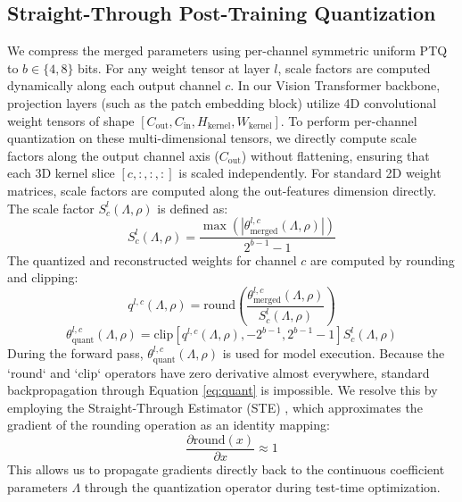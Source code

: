 \subsection{Straight-Through Post-Training Quantization}
We compress the merged parameters using per-channel symmetric uniform PTQ to $b \in \{4, 8\}$ bits. For any weight tensor at layer $l$, scale factors are computed dynamically along each output channel $c$. In our Vision Transformer backbone, projection layers (such as the patch embedding block) utilize 4D convolutional weight tensors of shape $[C_{\text{out}}, C_{\text{in}}, H_{\text{kernel}}, W_{\text{kernel}}]$. To perform per-channel quantization on these multi-dimensional tensors, we directly compute scale factors along the output channel axis ($C_{\text{out}}$) without flattening, ensuring that each 3D kernel slice $[c, :, :, :]$ is scaled independently. For standard 2D weight matrices, scale factors are computed along the out-features dimension directly. The scale factor $S^l_c(\Lambda, \rho)$ is defined as:
\begin{equation}
\label{eq:scale}
S^l_c(\Lambda, \rho) = \frac{\max\left(\left|\theta^{l,c}_{\text{merged}}(\Lambda, \rho)\right|\right)}{2^{b-1} - 1}
\end{equation}
The quantized and reconstructed weights for channel $c$ are computed by rounding and clipping:
\begin{equation}
\label{eq:quant_round}
q^{l,c}(\Lambda, \rho) = \text{round}\left(\frac{\theta^{l,c}_{\text{merged}}(\Lambda, \rho)}{S^l_c(\Lambda, \rho)}\right)
\end{equation}
\begin{equation}
\label{eq:quant}
\theta^{l,c}_{\text{quant}}(\Lambda, \rho) = \text{clip}\left[ q^{l,c}(\Lambda, \rho), -2^{b-1}, 2^{b-1}-1 \right] S^l_c(\Lambda, \rho)
\end{equation}
During the forward pass, $\theta^{l,c}_{\text{quant}}(\Lambda, \rho)$ is used for model execution. Because the `round` and `clip` operators have zero derivative almost everywhere, standard backpropagation through Equation \ref{eq:quant} is impossible. We resolve this by employing the Straight-Through Estimator (STE) \cite{Hubara2017Quantized}, which approximates the gradient of the rounding operation as an identity mapping:
\begin{equation}
\label{eq:ste}
\frac{\partial \text{round}(x)}{\partial x} \approx 1
\end{equation}
This allows us to propagate gradients directly back to the continuous coefficient parameters $\Lambda$ through the quantization operator during test-time optimization.

